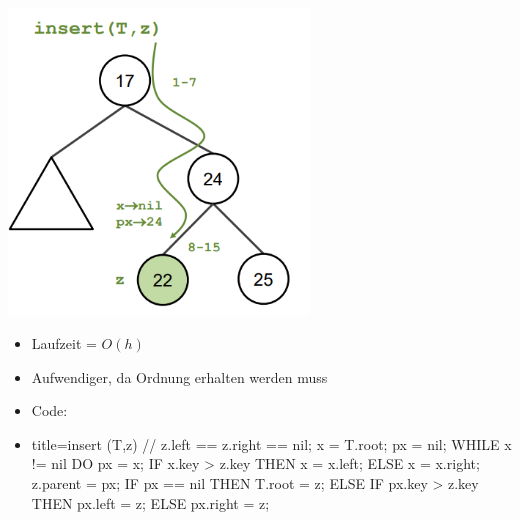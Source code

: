 \documentclass[
    12pt,
    a4paper,
    ngerman,
    color=3b,%
    marginpar=false,
    colorback=false,
    leqno,
]{tudaexercise}
\begin{document}
\begin{itemize}
\begin{itemize}
                    \includegraphics[width=8cm]{pictures/binärerSuchbaumEinfügen.PNG}
                    \begin{itemize}
                        \item Laufzeit = $O(h)$
                        \item Aufwendiger, da Ordnung erhalten werden muss
                        \item Code:
                        \item[]\label{BST-Insert}
                              \begin{codeBlock}[autogobble]{title={insert (T,z) // z.left == z.right == nil;}}
                                  x = T.root;
                                  px = nil;
                                  WHILE x != nil DO
                                    px = x;
                                    IF x.key > z.key THEN
                                        x = x.left;
                                    ELSE
                                        x = x.right;
                                  z.parent = px;
                                  IF px == nil THEN
                                    T.root = z;
                                  ELSE
                                    IF px.key > z.key THEN
                                        px.left = z;
                                    ELSE
                                        px.right = z;
                              \end{codeBlock}
                    \end{itemize}
          \end{itemize}

          \pagebreak


\end{itemize}
\end{document}
